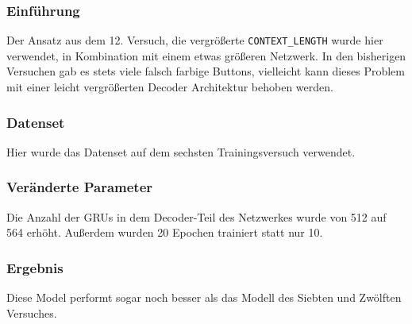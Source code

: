 \documentclass[pdftex,a4paper,halfparskip, article]{scrartcl}
\begin{document}
\subsubsection*{Einführung}

Der Ansatz aus dem 12. Versuch, die vergrößerte \texttt{CONTEXT\_LENGTH} wurde hier verwendet, in Kombination mit einem etwas größeren Netzwerk. In den bisherigen Versuchen gab es stets viele falsch farbige Buttons, vielleicht kann dieses Problem mit einer leicht vergrößerten Decoder Architektur behoben werden.

\subsubsection*{Datenset}

Hier wurde das Datenset auf dem sechsten Trainingsversuch verwendet.

\subsubsection*{Veränderte Parameter}

Die Anzahl der GRUs in dem Decoder-Teil des Netzwerkes wurde von 512 auf 564 erhöht. Außerdem wurden 20 Epochen trainiert statt nur 10.

\subsubsection*{Ergebnis}

Diese Model performt sogar noch besser als das Modell des Siebten und Zwölften Versuches.
\end{document}
